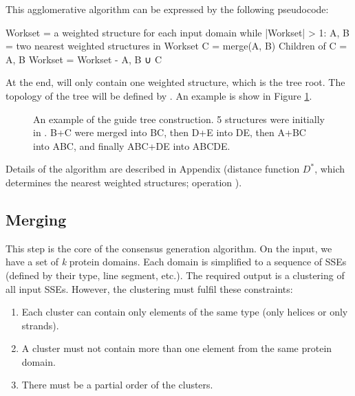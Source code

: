 \documentclass{article}
\begin{document}
This agglomerative algorithm can be expressed by the following
pseudocode:

\begin{codeblock}
    Workset = { a weighted structure for each input domain }  
    while |Workset| > 1:  
        A, B = two nearest weighted structures in Workset
        C = merge(A, B)  
        Children of C = {A, B}
        Workset = Workset - {A, B} ∪ {C}
\end{codeblock}

At the end,  will only contain one weighted structure,
which is the tree root. The topology of the tree will be defined by
. An example is show in Figure \ref{fig:guide_tree}.

\begin{figure}[h!]
  \caption{An example of the guide tree construction. 5 structures were initially in .
  B+C were merged into BC, then D+E into DE, then A+BC into ABC, and finally ABC+DE into ABCDE.}
  \label{fig:guide_tree}
\end{figure}

Details of the algorithm are described in Appendix (distance function
\(D^{*}\), which determines the nearest weighted structures; operation
).



\subsection{Merging}

This step is the core of the consensus generation algorithm. On the input, we
have a set of \emph{k} protein domains. Each domain is simplified to a
sequence of SSEs (defined by their type, line segment, etc.). The
required output is a clustering of all input SSEs. However, the
clustering must fulfil these constraints:

\begin{enumerate}
\def\labelenumi{\arabic{enumi}.}
\item
  Each cluster can contain only elements of the same type (only helices
  or only strands).
\item
  A cluster must not contain more than one element from the same protein
  domain.
\item
  There must be a partial order of the clusters.
\end{enumerate}
\end{document}
